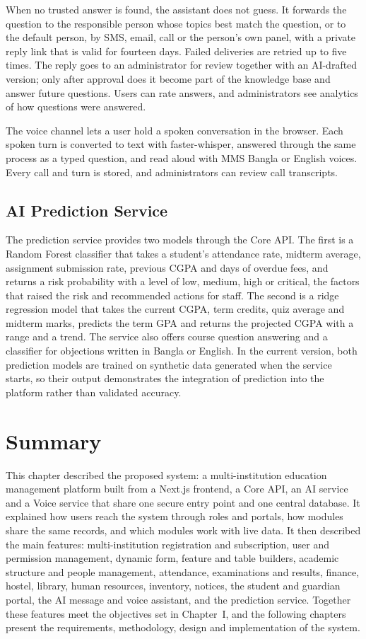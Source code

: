 When no trusted answer is found, the assistant does not guess. It forwards the question to the responsible person whose topics best match the question, or to the default person, by SMS, email, call or the person's own panel, with a private reply link that is valid for fourteen days. Failed deliveries are retried up to five times. The reply goes to an administrator for review together with an AI-drafted version; only after approval does it become part of the knowledge base and answer future questions. Users can rate answers, and administrators see analytics of how questions were answered.

The voice channel lets a user hold a spoken conversation in the browser. Each spoken turn is converted to text with faster-whisper, answered through the same process as a typed question, and read aloud with MMS Bangla or English voices. Every call and turn is stored, and administrators can review call transcripts.

\subsection{AI Prediction Service}
The prediction service provides two models through the Core API. The first is a Random Forest classifier that takes a student's attendance rate, midterm average, assignment submission rate, previous CGPA and days of overdue fees, and returns a risk probability with a level of low, medium, high or critical, the factors that raised the risk and recommended actions for staff. The second is a ridge regression model that takes the current CGPA, term credits, quiz average and midterm marks, predicts the term GPA and returns the projected CGPA with a range and a trend. The service also offers course question answering and a classifier for objections written in Bangla or English. In the current version, both prediction models are trained on synthetic data generated when the service starts, so their output demonstrates the integration of prediction into the platform rather than validated accuracy.

\section{Summary}
This chapter described the proposed system: a multi-institution education management platform built from a Next.js frontend, a Core API, an AI service and a Voice service that share one secure entry point and one central database. It explained how users reach the system through roles and portals, how modules share the same records, and which modules work with live data. It then described the main features: multi-institution registration and subscription, user and permission management, dynamic form, feature and table builders, academic structure and people management, attendance, examinations and results, finance, hostel, library, human resources, inventory, notices, the student and guardian portal, the AI message and voice assistant, and the prediction service. Together these features meet the objectives set in Chapter~I, and the following chapters present the requirements, methodology, design and implementation of the system.
